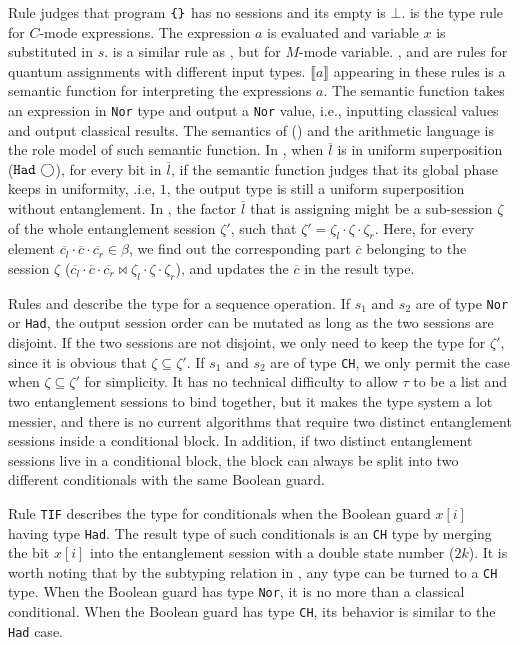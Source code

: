 Rule  judges that program $\texttt{\{\}}$ has no sessions and its empty is $\bot$.
 is the type rule for $C$-mode expressions.
The expression $a$ is evaluated and variable $x$ is substituted in $s$.
 is a similar rule as , but for $M$-mode variable.
,  and  are rules for quantum assignments with different input types.
$\llbracket a \rrbracket$ appearing in these rules is a semantic function for interpreting the expressions $a$.
The semantic function takes an expression in \texttt{Nor} type and output a \texttt{Nor} value,
i.e., inputting classical values and output classical results.
The semantics of \oqasm () and the arithmetic language \sourcelang
is the role model of such semantic function.
In , when $\overline{l}$ is in uniform superposition ($\texttt{Had}~{\bigcirc}$),
for every bit in $\overline{l}$, if the semantic function judges that its global phase keeps in uniformity, .i.e, $1$,
the output type is still a uniform superposition without entanglement.
In , the factor $\overline{l}$ that is assigning
might be a sub-session $\zeta$ of the whole entanglement session $\zeta'$,
such that $\zeta'= \zeta_l\cdot\zeta\cdot \zeta_r$.
Here, for every element $\overline{c_l}\cdot\overline{c}\cdot\overline{c_r}\in\beta$,
we find out the corresponding part $\overline{c}$ belonging to the session
$\zeta$ ($\overline{c_l}\cdot\overline{c}\cdot\overline{c_r}\bowtie\zeta_l\cdot\zeta\cdot\zeta_r$),
and updates the $\overline{c}$ in the result type.

Rules  and  describe the type for a sequence operation.
If $s_1$ and $s_2$ are of type \texttt{Nor} or \texttt{Had},
the output session order can be mutated as long as the two sessions are disjoint.
If the two sessions are not disjoint, we only need to keep the type for $\zeta'$,
since it is obvious that $\zeta \subseteq \zeta'$. 
If $s_1$ and $s_2$ are of type \texttt{CH},
we only permit the case when  $\zeta \subseteq \zeta'$ for simplicity.
It has no technical difficulty to allow $\tau$ to be a list
and two entanglement sessions to bind together,
but it makes the type system a lot messier,
and there is no current algorithms that require two distinct entanglement sessions inside a conditional block.
In addition, if two distinct entanglement sessions live in a conditional block,
the block can always be split into two different conditionals with the same Boolean guard.

Rule \texttt{TIF} describes the type for conditionals when the Boolean guard $x[i]$ having type \texttt{Had}.
The result type of such conditionals is an \texttt{CH} type
by merging the bit $x[i]$ into the entanglement session with a double state number ($2k$).
It is worth noting that by the subtyping relation in , any type can be turned to a \texttt{CH} type.
When the Boolean guard has type \texttt{Nor}, it is no more than a classical conditional.
When the Boolean guard has type \texttt{CH}, its behavior is similar to the \texttt{Had} case.

